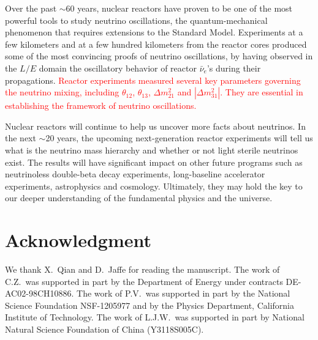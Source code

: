 \documentclass[aps,twocolumn,preprintnumbers,amsmath,superscriptaddress,amssymb,floats,nofootinbib]{revtex4-1}
\begin{document}
Over the past $\sim$60 years, nuclear reactors have proven to be one of the most powerful tools to study neutrino oscillations, the quantum-mechanical phenomenon that requires extensions to the Standard Model. Experiments at a few kilometers and at a few hundred kilometers from the reactor cores produced some of the most convincing proofs of neutrino oscillations, by having observed in the $L/E$ domain the oscillatory behavior of reactor $\bar\nu_e$'s during their propagations. \textcolor{red}{Reactor experiments measured several key parameters governing the neutrino mixing, including $\theta_{12}$, $\theta_{13}$, $\Delta{m}^2_{21}$ and $|\Delta{m}^2_{31}|$. They are essential in establishing the framework of neutrino oscillations.}

Nuclear reactors will continue to help us uncover more facts about neutrinos. In the next $\sim$20 years, the upcoming next-generation reactor experiments will tell us what is the neutrino mass hierarchy and whether or not light sterile neutrinos exist. The results will have significant impact on other future programs such as neutrinoless double-beta decay experiments, long-baseline accelerator experiments, astrophysics and cosmology. Ultimately, they may hold the key to our deeper understanding of the fundamental physics and the universe.

\vspace{12pt}
\section*{Acknowledgment}
We thank X.~Qian and D.~Jaffe for reading the manuscript.
The work of C.Z.~was supported in part by the Department of Energy under contracts DE-AC02-98CH10886.
The work of P.V.~was supported in part by the National Science Foundation NSF-1205977 and by the Physics Department, California Institute of Technology.
The work of L.J.W.~was supported in part by National Natural Science Foundation of China (Y3118S005C).





\end{document}
